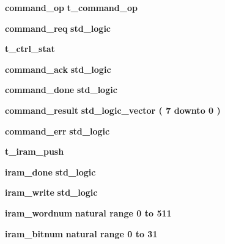 \begin{DoxyCompactItemize}
\item 
{\bf command\+\_\+op} {\bfseries {\bfseries {\bfseries {\bf t\+\_\+command\+\_\+op}} \textcolor{vhdlchar}{ }}} 
\item 
{\bf command\+\_\+req} {\bfseries {\bfseries \textcolor{comment}{std\+\_\+logic}\textcolor{vhdlchar}{ }}} 
\item 
{\bf t\+\_\+ctrl\+\_\+stat} {\bfseries  }
\item 
{\bf command\+\_\+ack} {\bfseries {\bfseries \textcolor{comment}{std\+\_\+logic}\textcolor{vhdlchar}{ }}} 
\item 
{\bf command\+\_\+done} {\bfseries {\bfseries \textcolor{comment}{std\+\_\+logic}\textcolor{vhdlchar}{ }}} 
\item 
{\bf command\+\_\+result} {\bfseries {\bfseries \textcolor{comment}{std\+\_\+logic\+\_\+vector}\textcolor{vhdlchar}{ }\textcolor{vhdlchar}{(}\textcolor{vhdlchar}{ }\textcolor{vhdlchar}{ } \textcolor{vhdldigit}{7} \textcolor{vhdlchar}{ }\textcolor{keywordflow}{downto}\textcolor{vhdlchar}{ }\textcolor{vhdlchar}{ } \textcolor{vhdldigit}{0} \textcolor{vhdlchar}{ }\textcolor{vhdlchar}{)}\textcolor{vhdlchar}{ }}} 
\item 
{\bf command\+\_\+err} {\bfseries {\bfseries \textcolor{comment}{std\+\_\+logic}\textcolor{vhdlchar}{ }}} 
\item 
{\bf t\+\_\+iram\+\_\+push} {\bfseries  }
\item 
{\bf iram\+\_\+done} {\bfseries {\bfseries \textcolor{comment}{std\+\_\+logic}\textcolor{vhdlchar}{ }}} 
\item 
{\bf iram\+\_\+write} {\bfseries {\bfseries \textcolor{comment}{std\+\_\+logic}\textcolor{vhdlchar}{ }}} 
\item 
{\bf iram\+\_\+wordnum} {\bfseries {\bfseries \textcolor{comment}{natural}\textcolor{vhdlchar}{ }\textcolor{vhdlchar}{ }\textcolor{vhdlchar}{ }\textcolor{keywordflow}{range}\textcolor{vhdlchar}{ }\textcolor{vhdlchar}{ } \textcolor{vhdldigit}{0} \textcolor{vhdlchar}{ }\textcolor{keywordflow}{to}\textcolor{vhdlchar}{ }\textcolor{vhdlchar}{ } \textcolor{vhdldigit}{511} \textcolor{vhdlchar}{ }}} 
\item 
{\bf iram\+\_\+bitnum} {\bfseries {\bfseries \textcolor{comment}{natural}\textcolor{vhdlchar}{ }\textcolor{vhdlchar}{ }\textcolor{vhdlchar}{ }\textcolor{keywordflow}{range}\textcolor{vhdlchar}{ }\textcolor{vhdlchar}{ } \textcolor{vhdldigit}{0} \textcolor{vhdlchar}{ }\textcolor{keywordflow}{to}\textcolor{vhdlchar}{ }\textcolor{vhdlchar}{ } \textcolor{vhdldigit}{31} \textcolor{vhdlchar}{ }}} 

\end{DoxyCompactItemize}
